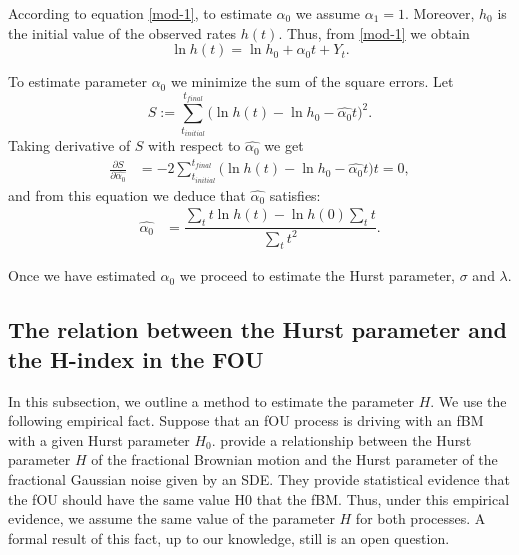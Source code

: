 \documentclass[smallextended]{svjour3}
\begin{document}
    According to equation \eqref{mod-1}, to estimate
    $\alpha_0$ we assume $\alpha_1=1$. Moreover, $h_0$ is the initial 
    value of the observed rates $h(t)$. Thus, from \eqref{mod-1} we obtain
    \begin{equation}
        \ln h(t)=\ln h_0+\alpha_0t+Y_t. \label{mod-ln}
    \end{equation}
    
    To estimate parameter $\alpha_0$ we minimize the 
    sum of the square errors.
    Let 
    \begin{equation*}
        S:= 
            \sum_{t_{initial}}^{t_{final}} \Big( \ln h(t)-\ln 
            h_0-\widehat{\alpha_0} t
        \Big)^2. 
    \end{equation*}
    Taking derivative of $S$ with respect
    to $\widehat{\alpha_0}$  we get
    \begin{align*}
        \frac{\partial S}{\partial \widehat{\alpha_0}}&=
            -2 \sum_{t_{initial}} ^ {t_{final}} 
            \Big( 
                \ln h(t)-\ln h_0-\widehat{\alpha_0} t
            \Big) t =0, %
    \end{align*}
    and from this equation we deduce that  $\widehat{\alpha_0}$
    satisfies:
    \begin{align}
        \widehat{\alpha_0} 
            &= 
            \dfrac{
                \sum_{t} t 
                \ln h(t) 
                - 
                \ln h(0)
                \sum_{t} t
            }{
                \sum_{t} t^2
            }. \label{alpha0}
    \end{align}

    Once we have estimated $\alpha_0$ we proceed to estimate the Hurst 
    parameter, $\sigma$ and $\lambda$.

\subsection{The relation between the Hurst parameter and the H-index in the FOU}

    In this subsection, we outline a method to estimate the parameter $H$. We 
    use the following empirical fact. Suppose that an fOU process is driving 
    with an fBM with a given Hurst parameter $H_0$. 
    \citet{ye-etal}  provide a relationship between the Hurst parameter $H$ of 
    the fractional Brownian motion and the Hurst parameter of the fractional 
    Gaussian noise given by an SDE. They provide statistical evidence that the 
    fOU should have the same value H0 that the fBM. Thus, under this empirical 
    evidence, we assume the same value of the parameter $H$ for both 
    processes.  A formal result of this fact, up to our knowledge, still is an 
    open question.
\end{document}
